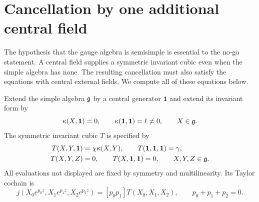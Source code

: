 \section{Cancellation by one additional central field}
\label{sec:central-extension}

The hypothesis that the gauge algebra is semisimple is essential to the
no-go statement.  A central field supplies a symmetric invariant cubic
even when the simple algebra has none.  The resulting cancellation must
also satisfy the equations with central external fields.  We compute all
of these equations below.

Extend the simple algebra $\mathfrak g$ by a central generator $\mathbf 1$ and
extend its invariant form by
\begin{equation}
 \kappa(X,\mathbf1)=0,\qquad
 \kappa(\mathbf1,\mathbf1)=\ell\ne0,\qquad X\in\mathfrak g.
 \label{eq:central-pairing}
\end{equation}
The symmetric invariant cubic $T$ is specified by
\begin{equation}
\begin{split}
 T(X,Y,\mathbf1)&=\chi\kappa(X,Y),\qquad
 T(\mathbf1,\mathbf1,\mathbf1)=\gamma,\\
 T(X,Y,Z)&=0,\qquad T(X,\mathbf1,\mathbf1)=0,
 \qquad X,Y,Z\in\mathfrak g.
\end{split}
\label{eq:central-cubic}
\end{equation}
All evaluations not displayed are fixed by symmetry and multilinearity.
Its Taylor cochain is
\begin{equation}
 j(X_0e^{p_0z},X_1e^{p_1z},X_2e^{p_2z})
   =[p_0p_1]T(X_0,X_1,X_2),\qquad p_0+p_1+p_2=0.
 \label{eq:central-j}
\end{equation}

